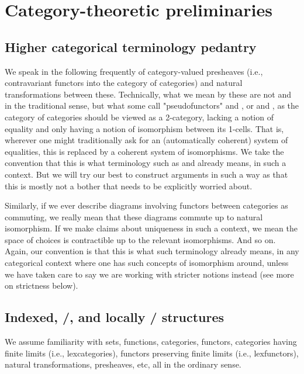 \section{Category-theoretic preliminaries}

\subsection{Higher categorical terminology pedantry}
We speak in the following frequently of category-valued presheaves (i.e., contravariant functors into the category of categories) and natural transformations between these. Technically, what we mean by these are not  and  in the traditional sense, but what some call "pseudofunctors" and , or  and , as the category of categories should be viewed as a 2-category, lacking a notion of equality and only having a notion of isomorphism between its 1-cells. That is, wherever one might traditionally ask for an (automatically coherent) system of equalities, this is replaced by a coherent system of isomorphisms. We take the convention that this is what terminology such as  and  already means, in such a context. But we will try our best to construct arguments in such a way as that this is mostly not a bother that needs to be explicitly worried about.

Similarly, if we ever describe diagrams involving functors between categories as commuting, we really mean that these diagrams commute up to natural isomorphism. If we make claims about uniqueness in such a context, we mean the space of choices is contractible up to the relevant isomorphisms. And so on. Again, our convention is that this is what such terminology already means, in any categorical context where one has such concepts of isomorphism around, unless we have taken care to say we are working with stricter notions instead (see more on strictness below).

\subsection{Indexed, \repsmall/, and locally \repsmall/ structures}
We assume familiarity with sets, functions, categories, functors, categories having finite limits (i.e., lexcategories), functors preserving finite limits (i.e., lexfunctors), natural transformations, presheaves, etc, all in the ordinary sense.


